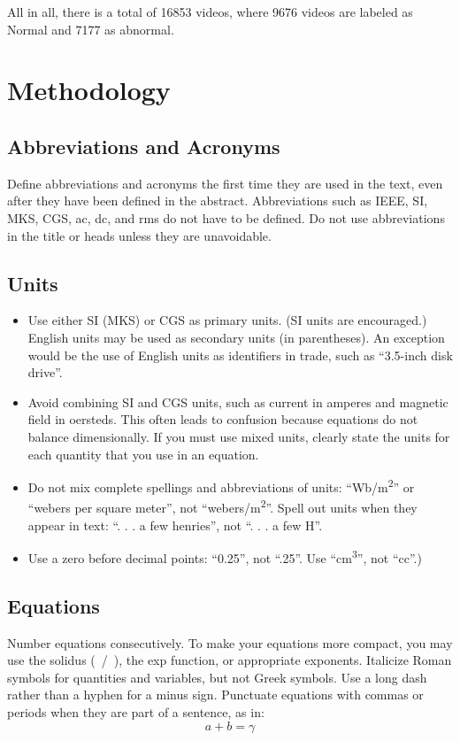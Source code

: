 \documentclass[conference]{IEEEtran}
\begin{document}
All in all, there is a total of 16853 videos, where 9676 videos are labeled as Normal and 7177 as abnormal.





\section{Methodology}


\subsection{Abbreviations and Acronyms}\label{AA}
Define abbreviations and acronyms the first time they are used in the text, 
even after they have been defined in the abstract. Abbreviations such as 
IEEE, SI, MKS, CGS, ac, dc, and rms do not have to be defined. Do not use 
abbreviations in the title or heads unless they are unavoidable.

\subsection{Units}
\begin{itemize}
\item Use either SI (MKS) or CGS as primary units. (SI units are encouraged.) English units may be used as secondary units (in parentheses). An exception would be the use of English units as identifiers in trade, such as ``3.5-inch disk drive''.
\item Avoid combining SI and CGS units, such as current in amperes and magnetic field in oersteds. This often leads to confusion because equations do not balance dimensionally. If you must use mixed units, clearly state the units for each quantity that you use in an equation.
\item Do not mix complete spellings and abbreviations of units: ``Wb/m\textsuperscript{2}'' or ``webers per square meter'', not ``webers/m\textsuperscript{2}''. Spell out units when they appear in text: ``. . . a few henries'', not ``. . . a few H''.
\item Use a zero before decimal points: ``0.25'', not ``.25''. Use ``cm\textsuperscript{3}'', not ``cc''.)
\end{itemize}

\subsection{Equations}
Number equations consecutively. To make your 
equations more compact, you may use the solidus (~/~), the exp function, or 
appropriate exponents. Italicize Roman symbols for quantities and variables, 
but not Greek symbols. Use a long dash rather than a hyphen for a minus 
sign. Punctuate equations with commas or periods when they are part of a 
sentence, as in:
\begin{equation}
a+b=\gamma\label{eq}
\end{equation}
\end{document}
